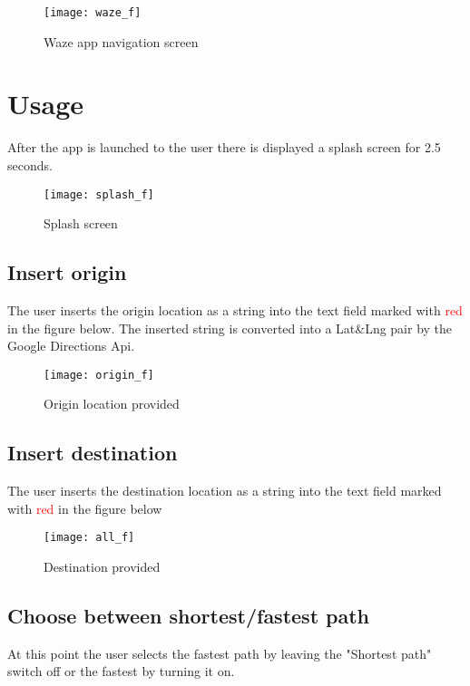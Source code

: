 \documentclass[11,titlepage]{article}
\begin{document}
	
	\begin{figure}[H]
		\begin{center}
		\texttt{[image: waze\_f]}
		\caption{Waze app navigation screen}
		\end{center}
	\end{figure}
	
	

\section{Usage}
	After the app is launched to the user there is displayed a splash screen for 2.5 seconds.
	
	
	\begin{figure}[H]
		\begin{center}
		\texttt{[image: splash\_f]}
		\caption{Splash screen}
		\end{center}
	\end{figure}
	
	\subsection{Insert origin}
		The user inserts the origin location as a string into the text field marked with \textcolor{red}{red} in the figure below. The inserted string is converted into a Lat\&Lng pair by the Google Directions Api.
		
		
	\begin{figure}[H]
		\begin{center}
		\texttt{[image: origin\_f]}
		\caption{Origin location provided}
		\end{center}
	\end{figure}
		
	\subsection{Insert destination}
	The user inserts the destination location as a string into the text field marked with \textcolor{red}{red} in the figure below

		
	\begin{figure}[H]
		\begin{center}
		\texttt{[image: all\_f]}
		\caption{Destination provided}
		\end{center}
	\end{figure}
	
	\subsection{Choose between shortest/fastest path}
	At this point the user selects the fastest path by leaving the "Shortest path" switch off or the fastest by turning it on.
	
\end{document}
